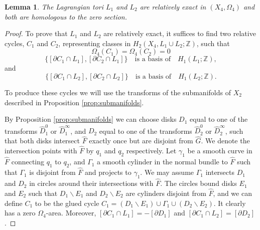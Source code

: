 \documentclass[10pt,a4paper]{amsart}
\newtheorem{lemma}{Lemma}
\newcommand{\ZZ}{{\mathbb Z}}
\begin{document}
\begin{lemma}\label{lem:pre}
    The Lagrangian tori $L_1$ and $L_2$ are relatively exact in $(X_4, \Omega_4)$ and both are homologous to the zero section.
\end{lemma}

\begin{proof}

To prove that $L_1$ and $L_2$ are relatively exact, it suffices to find two relative cycles,  $C_1$ and $C_2$, representing classes in $H_2(X_4, L_1 \cup L_2;\ZZ)$, such that 
\begin{equation}
\Omega_4(C_1) = \Omega_4(C_2) =0
\end{equation}
\begin{equation}
\{[\partial C_1 \cap L_1], [\partial C_2 \cap L_1]\}\quad \text{is a basis of} \quad   H_1(L_1;\ZZ),
\end{equation}
and 
\begin{equation}
\{[\partial C_1 \cap L_2], [\partial C_2 \cap L_2]\} \quad \text{is a basis of} \quad H_1(L_2;\ZZ).
\end{equation}

To produce these cycles we will use the transforms of the submanifolds of $X_2$ described in Proposition \ref{prop:submanifolds}.

By Proposition \ref{prop:submanifolds} we can choose disks $D_1$ equal to one of the transforms $\hat{D}^0_1$ or $\hat{D}^\infty_1$, and $D_2$ equal to one of the transforms $\hat{D}^0_2$ or $\hat{D}^\infty_2$, such that both disks intersect $\hat{F}$ exactly once but are disjoint from $\hat{G}$. We denote the intersection points with $\hat{F}$ by $q_1$ and $q_2$ respectively.
Let $\gamma_1$ be a smooth curve in $\hat{F}$ connecting $q_1$ to $q_2$, and $\Gamma_1$ a smooth cylinder in the normal bundle to $\hat{F}$ such that $\Gamma_1$ is disjoint from $\hat{F}$ and projects to $\gamma_1$. We may assume $\Gamma_1$ intersects $D_1$ and $D_2$ in circles around their intersections with $\hat{F}$. The circles bound disks $E_1$ and $E_2$ such that $D_1 \smallsetminus E_1$ and $D_2 \smallsetminus E_2$ are cylinders disjoint from $\hat{F}$, and we can define $C_1$ to be the glued cycle $C_1 = (D_1 \smallsetminus E_1) \cup \Gamma_1 \cup (D_2 \smallsetminus E_2)$. %
It clearly has a zero $\Omega_4$-area. Moreover,  $[\partial C_1 \cap L_1]=-[\partial D_1]$ and $[\partial C_1 \cap L_2]=[\partial D_2]$.


\end{proof}
\end{document}
